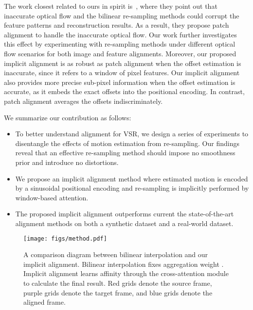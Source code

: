 \documentclass[10pt,twocolumn,letterpaper]{article}
\newcommand{\tpt}[1]{{\color{purple} {#1}}}
\newcommand{\tvt}[1]{{\color{violet} {#1}}}
\newcommand{\tct}[1]{{\color{cyan} {#1}}}
\begin{document}
The work closest related to ours in spirit is~\cite{shi2022rethinking}, where they point out that inaccurate optical flow and the bilinear re-sampling methods could corrupt the feature patterns and reconstruction results. As a result, they propose patch alignment to handle the inaccurate optical flow. Our work further investigates this effect by experimenting with re-sampling methods under different optical flow scenarios for both image and feature alignments. Moreover, our proposed implicit alignment is as robust as patch alignment when the offset estimation is inaccurate, since it refers to a window of pixel features. Our implicit alignment also provides more precise sub-pixel information when the offset estimation is accurate, as it embeds the exact offsets into the positional encoding.  In contrast, patch alignment averages the offsets indiscriminately.





We summarize our contribution as follows:
\begin{itemize}
    \item To better understand alignment for VSR, we design a series of experiments to disentangle the effects of motion estimation from re-sampling. Our findings reveal that an effective re-sampling method should impose no smoothness prior and introduce no distortions.
    \item We propose an implicit alignment method where estimated motion is encoded by a sinusoidal positional encoding and re-sampling is implicitly performed by window-based attention.
    \item The proposed implicit alignment outperforms current the state-of-the-art alignment methods on both a synthetic dataset and a real-world dataset.
\end{itemize}


\begin{figure*}[t]
\centering

\texttt{[image: figs/method.pdf]}
\vspace{-.3cm}
\caption{A comparison diagram between bilinear interpolation and our implicit alignment. Bilinear interpolation fixes aggregation weight . Implicit alignment learns affinity through the cross-attention module to calculate the final result. \tpt{Red grids} denote the source frame, \tvt{purple grids} denote the target frame, and \tct{blue grids} denote the aligned frame.}
\vspace{-.3cm}
\end{figure*}
\end{document}

